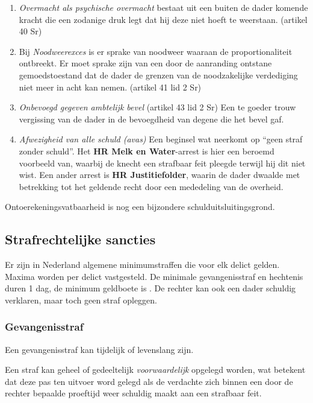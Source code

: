 \documentclass{article}
\begin{document}
\begin{enumerate}

  \item \emph{Overmacht als psychische overmacht} bestaat uit een buiten de
    dader komende kracht die een zodanige druk legt dat hij deze niet hoeft te
    weerstaan. (artikel 40 Sr)

  \item Bij \emph{Noodweerexces} is er sprake van noodweer waaraan de proportionaliteit
    ontbreekt. Er moet sprake zijn van een door de aanranding ontstane gemoedstoestand
    dat de dader de grenzen van de noodzakelijke verdediging niet meer in acht kan nemen.
    (artikel 41 lid 2 Sr)

  \item \emph{Onbevoegd gegeven ambtelijk bevel} (artikel 43 lid 2 Sr) Een te
    goeder trouw vergissing van de dader in de bevoegdheid van degene die het
    bevel gaf.

  \item \emph{Afwezigheid van alle schuld (avas)} Een beginsel wat neerkomt op
    ``geen straf zonder schuld''. Het \textbf{HR Melk en Water}-arrest is hier
    een beroemd voorbeeld van, waarbij de knecht een strafbaar feit pleegde
    terwijl hij dit niet wist. Een ander arrest is \textbf{HR Justitiefolder},
    waarin de dader dwaalde met betrekking tot het geldende recht door een
    mededeling van de overheid.

\end{enumerate}

Ontoerekeningsvatbaarheid is nog een bijzondere schulduitsluitingsgrond.

\subsection{Strafrechtelijke sancties}

Er zijn in Nederland algemene minimumstraffen die voor elk delict gelden.
Maxima worden per delict vastgesteld. De minimale gevangenisstraf en hechtenis
duren 1 dag, de minimum geldboete is . De rechter kan ook een dader
schuldig verklaren, maar toch geen straf opleggen.

\subsubsection{Gevangenisstraf}

Een gevangenisstraf kan tijdelijk of levenslang zijn.

Een straf kan geheel of gedeeltelijk \emph{voorwaardelijk} opgelegd worden, wat
betekent dat deze pas ten uitvoer word gelegd als de verdachte zich binnen een
door de rechter bepaalde proeftijd weer schuldig maakt aan een strafbaar feit.
\end{document}
